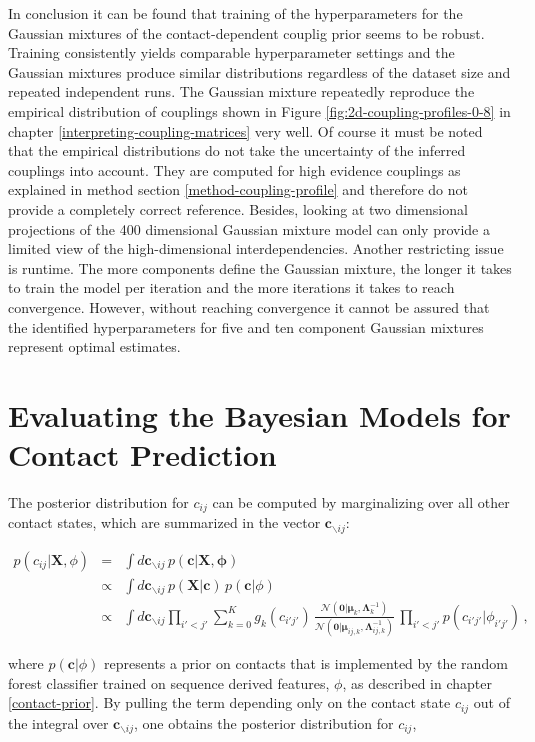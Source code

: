 \documentclass[11pt,a4paper,twoside]{book}
\newcommand{\Gauss}{\mathcal{N}}
\newcommand{\Lijk}{\mathbf{\Lambda}_{ij,k}}
\newcommand{\Lk}{\mathbf{\Lambda}_k}
\newcommand{\muijk}{\mathbf{\mu}_{ij,k}}
\newcommand{\muk}{\mathbf{\mu}_k}
\renewcommand{\c}{\mathbf{c}}
\newcommand{\cij}{c_{ij}}
\newcommand{\X}{\mathbf{X}}
\theoremstyle{definition}
\theoremstyle{definition}
\theoremstyle{remark}
\begin{document}
In conclusion it can be found that training of the hyperparameters for
the Gaussian mixtures of the contact-dependent couplig prior seems to be
robust. Training consistently yields comparable hyperparameter settings
and the Gaussian mixtures produce similar distributions regardless of
the dataset size and repeated independent runs. The Gaussian mixture
repeatedly reproduce the empirical distribution of couplings shown in
Figure \ref{fig:2d-coupling-profiles-0-8} in chapter
\ref{interpreting-coupling-matrices} very well. Of course it must be
noted that the empirical distributions do not take the uncertainty of
the inferred couplings into account. They are computed for high evidence
couplings as explained in method section \ref{method-coupling-profile}
and therefore do not provide a completely correct reference. Besides,
looking at two dimensional projections of the 400 dimensional Gaussian
mixture model can only provide a limited view of the high-dimensional
interdependencies. Another restricting issue is runtime. The more
components define the Gaussian mixture, the longer it takes to train the
model per iteration and the more iterations it takes to reach
convergence. However, without reaching convergence it cannot be assured
that the identified hyperparameters for five and ten component Gaussian
mixtures represent optimal estimates.

\section{Evaluating the Bayesian Models for Contact
Prediction}\label{posterior-of-rij}

The posterior distribution for \(c_{ij}\) can be computed by
marginalizing over all other contact states, which are summarized in the
vector \(\c_{\backslash ij}\):

\begin{eqnarray}
    p(\cij | \X, \phi) &=& \int d \c_{\backslash ij} \, p(\c |\X, \mathbf{\phi}) \nonumber\\
                &\propto & \int d \c_{\backslash ij} \, p(\X|\c) \, p(\c | \phi) \nonumber\\
                &\propto & \int d \c_{\backslash ij} \prod_{i'<j'} \sum_{k=0}^K g_{k}(c_{i'j'}) \, \frac{\Gauss( \mathbf{0} | \muk, \Lk^{-1})}{\Gauss(\mathbf{0} | \muijk, \Lijk^{-1})}
 \, \prod_{i'<j'} p(c_{i'j'} |\phi_{i'j'})  \,,
 \end{eqnarray}

where \(p(\c | \phi)\) represents a prior on contacts that is
implemented by the random forest classifier trained on sequence derived
features, \(\phi\), as described in chapter \ref{contact-prior}. By
pulling the term depending only on the contact state \(\cij\) out of the
integral over \(\c_{\backslash ij}\), one obtains the posterior
distribution for \(c_{ij}\),
\end{document}
